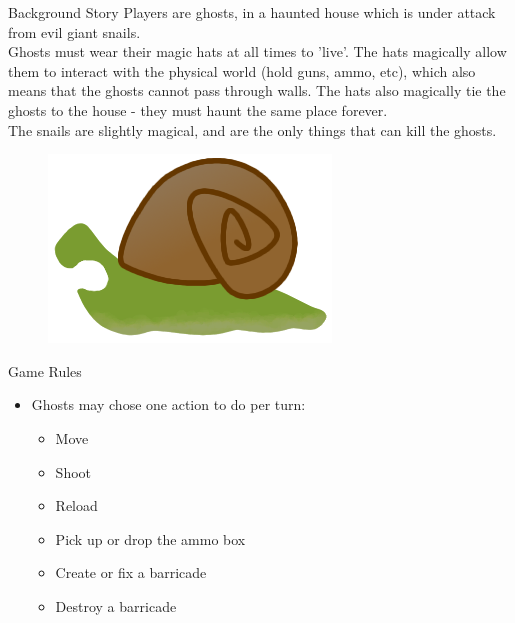 \documentclass{beamer}
\begin{document}
\begin{frame}{Background Story}
  Players are ghosts, in a haunted house which is under attack from evil giant snails.\\
  Ghosts must wear their magic hats at all times to 'live'. The hats magically allow them to interact with the physical world (hold guns, ammo, etc), which also means that the ghosts cannot pass through walls. The hats also magically tie the ghosts to the house - they must haunt the same place forever.\\
  The snails are slightly magical, and are the only things that can kill the ghosts.\\
  \vspace{\baselineskip}
  \begin{figure}
    \hfill
    \includegraphics[scale=0.15]{snail_teeth_flip.png}
  \end{figure}
\end{frame}

\begin{frame}{Game Rules}
  \begin{itemize}
    \item Ghosts may chose one action to do per turn:
    \vspace{\baselineskip}
      \begin{itemize}
        \item Move
        \item Shoot
        \item Reload
        \item Pick up or drop the ammo box
        \item Create or fix a barricade
        \item Destroy a barricade
      \end{itemize}
  \end{itemize}
\end{frame}
\end{document}

